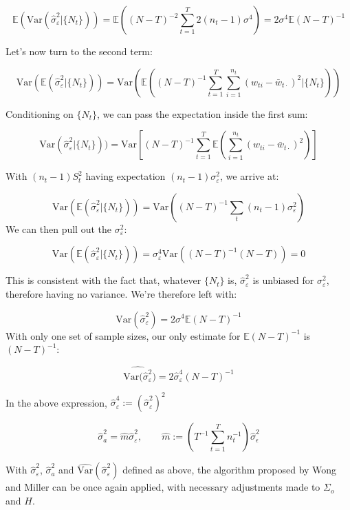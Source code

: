 $$ \mathbb{E}(\text{Var}(\hat{\sigma}_\varepsilon^2|\{N_t\})) = \mathbb{E}\left((N-T)^{-2}\sum_{t=1}^T2(n_t-1)\sigma^4\right) = 2\sigma^4\mathbb{E}(N-T)^{-1} $$

Let's now turn to the second term:

$$ \text{Var}(\mathbb{E}(\hat{\sigma}_\varepsilon^2|\{N_t\})) = \text{Var}(\mathbb{E}((N-T)^{-1}\sum_{t=1}^T\sum_{i=1}^{n_t}(w_{ti} - \bar{w}_{t\cdot})^2|\{N_t\})) $$

Conditioning on $\{N_t\}$, we can pass the expectation inside the first sum:

$$ \text{Var}(\hat{\sigma}_\varepsilon^2|\{N_t\})) = \text{Var}\left[(N-T)^{-1}\sum_{t=1}^T\mathbb{E}\left(\sum_{i=1}^{n_t}(w_{ti} - \bar{w}_{t\cdot})^2\right)\right] $$

With $(n_t-1)S_t^2$ having expectation $(n_t-1)\sigma_\varepsilon^2$, we arrive at:

$$ \text{Var}(\mathbb{E}(\hat{\sigma}_\varepsilon^2|\{N_t\})) = \text{Var}((N-T)^{-1}\sum_{t}(n_t-1)\sigma_\varepsilon^2) $$
We can then pull out the $\sigma_\varepsilon^2$:

$$ \text{Var}(\mathbb{E}(\hat{\sigma}_\varepsilon^2|\{N_t\})) = \sigma_\varepsilon^4\text{Var}((N-T)^{-1}(N-T)) = 0 $$

This is consistent with the fact that, whatever $\{N_t\}$ is, $\hat{\sigma}_\varepsilon^2$ is unbiased for $\sigma_\varepsilon^2$, therefore having no variance. We're therefore left with:

$$ \text{Var}(\hat{\sigma}_\varepsilon^2) = 2\sigma^4\mathbb{E}(N-T)^{-1} $$
With only one set of sample sizes, our only estimate for $\mathbb{E}(N-T)^{-1}$ is $(N-T)^{-1}$:


$$\widehat{\text{Var}(\hat{\sigma}_\varepsilon^2}) = 2\hat{\sigma}_\varepsilon^4{(N-T)^{-1}}$$

In the above expression, $\hat{\sigma}_\varepsilon^4:= (\hat{\sigma}_\varepsilon^2)^2$

\begin{equation}
    \hat{\sigma}_a^2 =  \hat{m}\hat{\sigma}_\varepsilon^2, \qquad \hat{m}:=\left(T^{-1}\sum_{t=1}^Tn_t^{-1}\right)\hat{\sigma}_\epsilon^2 
    \label{eq:m_hat}
\end{equation} 

With $\hat{\sigma}_\varepsilon^2$, $\hat{\sigma}_a^2$ and $\hat{\text{Var}}(\hat{\sigma}_\varepsilon^2)$ defined as above, the algorithm proposed by Wong and Miller can be once again applied, with necessary adjustments made to $\Sigma_o$ and $H$. 



